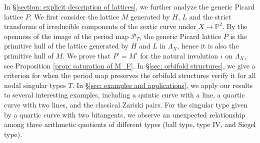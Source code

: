 \documentclass[12pt,reqno,a4paper]{amsart}
\theoremstyle{remark}
\theoremstyle{definition}
\newcommand{\PP}{\mathbb{P}}
\newcommand{\DD}{\mathbb{D}}
\newcommand{\Prd}{\mathscr{P}}
\newcommand{\calH}{\mathcal{H}}
\newcommand{\calM}{\mathcal{M}}
\newcommand{\bs}{\backslash}
\begin{document}

In \S \ref{section: explicit description of lattices}, we further analyze the generic Picard lattice $P$. 
We first consider the lattice $M$ generated by $H$, $L$ and the strict transforms of irreducible components of the sextic curve under $X\to \PP^2$. By the openness of the image of the period map $\Prd_T$, the generic Picard lattice $P$ is the primitive hull of the lattice generated by $H$ and $L$ in $\Lambda_X$, hence it is also the primitive hull of $M$. We prove that $P^\iota=M^\iota$ for the natural involution $\iota$ on $\Lambda_X$, see Proposition \ref{prop: saturation of M_F}.
In \S \ref{sec: orbifold structures}, we give a criterion for when the period map preserves the orbifold structures verify it for all nodal singular types $T$.
In \S \ref{sec: examples and applications}, we apply our results to several interesting examples, including a quintic curve with a line, a quartic curve with two lines, and the classical Zariski pairs. For the singular type given by a quartic curve with two bitangents, we observe an unexpected relationship among three arithmetic quotients of different types (ball type, type IV, and Siegel type).

\end{document}
